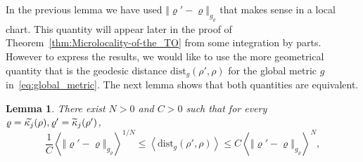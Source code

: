 \documentclass[10pt]{amsart}
\newtheorem{lemm}[theo]{Lemma}\newtheorem{prop}[theo]{Proposition}\newtheorem{coro}[theo]{Corollary}\newtheorem{conj}[theo]{Conjecture}
\theoremstyle{definition}\newtheorem{defi}[theo]{Definition}\newtheorem{rema}[theo]{Remark}\newtheorem{exam}[theo]{Example}\newtheorem{exem}[theo]{Example}\newtheorem{nota}[theo]{Notation}
\newcommand{\dist}{\mathrm{dist}}
\let\oldtilde\tilde
\renewcommand*{\tilde}[1]{\mathchoice{\widetilde{#1}}{\widetilde{#1}}{\oldtilde{#1}}{\oldtilde{#1}}}
\begin{document}
In the previous lemma we have used $\Vert \varrho'-\varrho\Vert _{g_{\varrho}}$ that makes sense in a local chart. This quantity will appear later in the proof of Theorem~\ref{thm:Microlocality-of-the_TO} from some integration by parts. However to express the results, we would like to use the more geometrical quantity that is the geodesic distance $\dist_{g}(\rho',\rho)$ for the global metric $g$ in~\eqref{eq:global_metric}. The next lemma shows that both quantities are equivalent.

\begin{cBoxB}{}
\begin{lemm}\label{lem:There-exist-}
There exist $N>0$ and $C>0$ such that for every $\varrho=\tilde{\kappa_{j}}(\rho),\varrho'=\tilde{\kappa}_{j}(\rho')$,
\begin{equation}\label{eq:log_log}
\frac{1}{C}\left\langle \left\Vert \varrho'-\varrho\right\Vert _{g_{\varrho}}\right\rangle ^{1/N}\leq\left\langle \dist_{g}\left(\rho',\rho\right)\right\rangle \leq C\left\langle \left\Vert \varrho'-\varrho\right\Vert _{g_{\varrho}}\right\rangle ^{N},
\end{equation}
\end{lemm}
\end{cBoxB}
\end{document}
